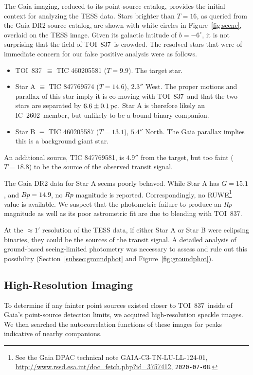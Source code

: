 \documentclass[12pt,twocolumn,tighten]{aastex63}
\newcommand{\tn}{TOI~837} %
\newcommand{\cn}{IC~2602} %
\begin{document}
The Gaia imaging, reduced to its point-source catalog, provides the
initial context for analyzing the TESS data.  Stars brighter than
$T=16$, as queried from the Gaia DR2 source catalog, are shown with
white circles in Figure~\ref{fig:scene}, overlaid on the TESS image.
Given its galactic latitude of $b=-6^\circ$, it is not surprising that
the field of \tn\ is crowded.  The resolved stars that were of
immediate concern for our false positive analysis were as follows.
\begin{itemize}
  \item \tn\ $\equiv$ TIC 460205581 ($T=9.9$). The target star.
  \item Star A $\equiv$ TIC 847769574 ($T=14.6$), $2.3''$ West. The
    proper motions and parallax of this star imply it is co-moving
    with \tn\ and that the two stars are separated by $6.6\pm
    0.1\,{\rm pc}$.  Star A is therefore likely an \cn\ member, but
    unlikely to be a bound binary companion.
  \item Star B $\equiv$ TIC 460205587 ($T=13.1$), $5.4''$ North.  The
    Gaia parallax implies this is a background giant star.
\end{itemize}
An additional source, TIC 847769581, is $4.9''$ from the target, but
too faint ($T=18.8$) to be the source of the observed transit signal.

The Gaia DR2 data for Star A seems poorly behaved.  While Star A has
$G=15.1$, and $Bp=14.9$, no $Rp$ magnitude is reported.
Correspondingly, no RUWE\footnote{ See the Gaia DPAC technical note
GAIA-C3-TN-LU-LL-124-01,
\url{http://www.rssd.esa.int/doc_fetch.php?id=3757412},
\texttt{2020-07-08}. } value is available.  We suspect that the
photometric failure to produce an $Rp$ magnitude as well as its poor
astrometric fit are due to blending with \tn.

At the $\approx1'$ resolution of the TESS data, if either Star A or
Star B were eclipsing binaries, they could be the sources of the
transit signal.  A detailed analysis of ground-based seeing-limited
photometry was necessary to assess and rule out this possibility
(Section~\ref{subsec:groundphot} and Figure~\ref{fig:groundphot}).


\subsection{High-Resolution Imaging}
\label{subsec:speckle}

To determine if any fainter point sources existed closer to \tn\
inside of Gaia's point-source detection limits, we acquired
high-resolution speckle images. We then searched the autocorrelation
functions of these images for peaks indicative of nearby companions.
\end{document}
